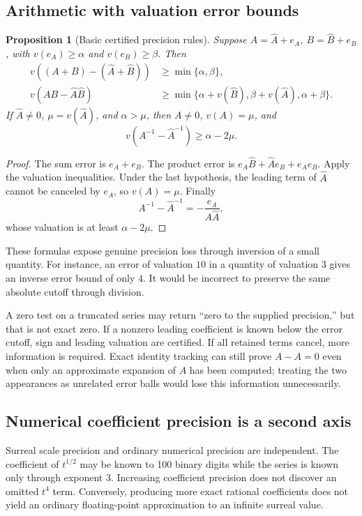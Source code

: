 \documentclass[11pt,letterpaper]{article}
\numberwithin{equation}{section}
\newtheorem{proposition}[theorem]{Proposition}
\theoremstyle{definition}
\theoremstyle{remark}\newtheorem{remark}[theorem]{Remark}
\begin{document}
\subsection{Arithmetic with valuation error bounds}
\begin{proposition}[Basic certified precision rules]\label{prop:precision}
Suppose $A=\widehat A+e_A$, $B=\widehat B+e_B$, with
$v(e_A)\ge\alpha$ and $v(e_B)\ge\beta$. Then
\begin{align}
 v((A+B)-(\widehat A+\widehat B))&\ge\min\{\alpha,\beta\},\label{eq:addprecision}\\
 v(AB-\widehat A\widehat B)&\ge
 \min\{\alpha+v(\widehat B),\beta+v(\widehat A),\alpha+\beta\}.
 \label{eq:mulprecision}
\end{align}
If $\widehat A\ne0$, $\mu=v(\widehat A)$, and $\alpha>\mu$, then
$A\ne0$, $v(A)=\mu$, and
\begin{equation}\label{eq:invprecision}
 v(A^{-1}-\widehat A^{-1})\ge\alpha-2\mu.
\end{equation}
\end{proposition}
\begin{proof}
The sum error is $e_A+e_B$. The product error is
$e_A\widehat B+\widehat A e_B+e_Ae_B$. Apply the valuation inequalities.
Under the last hypothesis, the leading term of $\widehat A$ cannot be canceled
by $e_A$, so $v(A)=\mu$. Finally
\[
 A^{-1}-\widehat A^{-1}=-\frac{e_A}{A\widehat A},
\]
whose valuation is at least $\alpha-2\mu$.
\end{proof}
These formulas expose genuine precision loss through inversion of a small
quantity. For instance, an error of valuation $10$ in a quantity of valuation
$3$ gives an inverse error bound of only $4$. It would be incorrect to
preserve the same absolute cutoff through division.

A zero test on a truncated series may return ``zero to the supplied
precision,'' but that is not exact zero. If a nonzero leading coefficient is
known below the error cutoff, sign and leading valuation are certified. If
all retained terms cancel, more information is required. Exact identity
tracking can still prove $A-A=0$ even when only an approximate expansion of
$A$ has been computed; treating the two appearances as unrelated error balls
would lose this information unnecessarily.

\subsection{Numerical coefficient precision is a second axis}
Surreal scale precision and ordinary numerical precision are independent.
The coefficient of $t^{1/2}$ may be known to 100 binary digits while the
series is known only through exponent $3$. Increasing coefficient precision
does not discover an omitted $t^4$ term. Conversely, producing more exact
rational coefficients does not yield an ordinary floating-point
approximation to an infinite surreal value.
\end{document}
